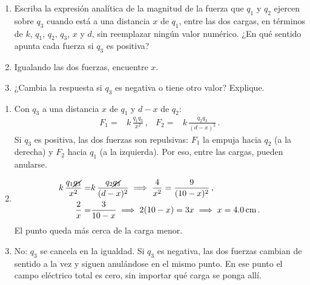 \documentclass[12pt, a4paper]{article}
\begin{document}
\begin{exercise}[ID=coulomb-nulo, subtitle={Punto de fuerza nula}, tags={parcial3}, points=25, nuevapagina=true]
\begin{center}
\end{center}

\begin{enumerate}
    \item Escriba la expresión analítica de la magnitud de la fuerza que $q_1$ y $q_2$ ejercen sobre $q_3$ cuando está a una distancia $x$ de $q_1$, entre las dos cargas, en términos de $k$, $q_1$, $q_2$, $q_3$, $x$ y $d$, sin reemplazar ningún valor numérico. ¿En qué sentido apunta cada fuerza si $q_3$ es positiva?
    \item Igualando las dos fuerzas, encuentre $x$.
    \item ¿Cambia la respuesta si $q_3$ es negativa o tiene otro valor? Explique.
\end{enumerate}
\end{exercise}
\begin{solution}
\begin{enumerate}
    \item Con $q_3$ a una distancia $x$ de $q_1$ y $d - x$ de $q_2$:
    \begin{align}
        F_1 =& k\,\frac{q_1 q_3}{x^2}\,, & F_2 =& k\,\frac{q_2 q_3}{(d-x)^2}\,.
    \end{align}
    Si $q_3$ es positiva, las dos fuerzas son repulsivas: $F_1$ la empuja hacia $q_2$ (a la derecha) y $F_2$ hacia $q_1$ (a la izquierda). Por eso, entre las cargas, pueden anularse.
    \item
    \begin{align}
        k\,\frac{q_1 \cancel{q_3}}{x^2} =& k\,\frac{q_2 \cancel{q_3}}{(d-x)^2}
        \;\Longrightarrow\; \frac{4}{x^2} = \frac{9}{(10-x)^2}\,, \nonumber\\
        \frac{2}{x} =& \frac{3}{10-x} \;\Longrightarrow\; 2(10 - x) = 3x \;\Longrightarrow\; x = \qty{4.0}{\centi\meter}\,.
    \end{align}
    El punto queda más cerca de la carga menor.
    \item No: $q_3$ se cancela en la igualdad. Si $q_3$ es negativa, las dos fuerzas cambian de sentido a la vez y siguen anulándose en el mismo punto. En ese punto el campo eléctrico total es cero, sin importar qué carga se ponga allí.
\end{enumerate}
\end{solution}
\end{document}
